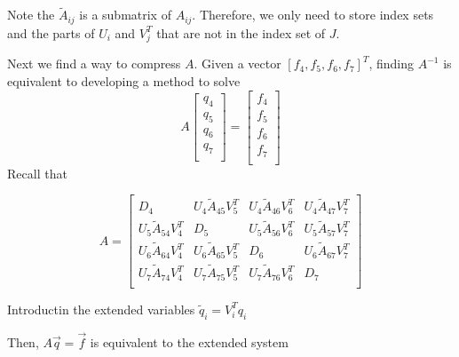 Note the $\widetilde{A}_{ij}$ is a submatrix of $A_{ij}$. Therefore, we only need to store index sets and the parts of $U_i$ and $V^T_j$ that are not in the index set of $J$.

Next we find a way to compress $A$. Given a vector $[f_4, f_5, f_6, f_7]^T$, finding $A^{-1}$ is equivalent to developing a method to solve
\begin{equation*}
    A
    \begin{bmatrix}
        q_4 \\
        q_5 \\
        q_6 \\
        q_7 \\
    \end{bmatrix}
    =
    \begin{bmatrix}
        f_4 \\
        f_5 \\
        f_6 \\
        f_7 \\
    \end{bmatrix}
\end{equation*}
Recall that

\begin{equation*}
    A =
    \begin{bmatrix}
        D_4    & U_4\widetilde{A}_{45}V^T_5 & U_4\widetilde{A}_{46}V^T_6 & U_4\widetilde{A}_{47}V^T_7 \\
        U_5\widetilde{A}_{54}V^T_4 & D_5    & U_5\widetilde{A}_{56}V^T_6 & U_5\widetilde{A}_{57}V^T_7 \\
        U_6\widetilde{A}_{64}V^T_4 & U_6\widetilde{A}_{65}V^T_5 & D_6 & U_6\widetilde{A}_{67}V^T_7 \\
        U_7\widetilde{A}_{74}V^T_4 & U_7\widetilde{A}_{75}V^T_5 & U_7\widetilde{A}_{76}V^T_6 & D_7    \\
    \end{bmatrix}
\end{equation*}

Introductin the extended variables $\widetilde{q}_i = V^T_i q_i$

Then, $A\vec{q} = \vec{f}$ is equivalent to the extended system

